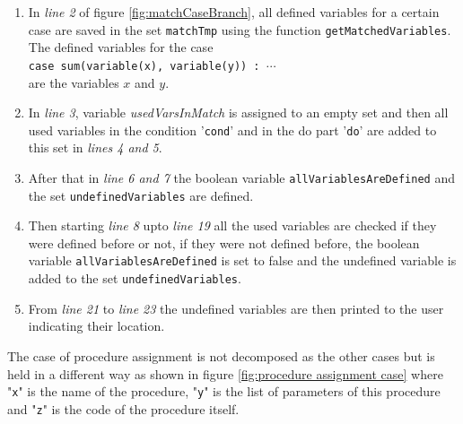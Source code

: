 \documentclass[11pt]{report}
\begin{document}
\begin{enumerate}
\item In \textsl{line 2} of figure \ref{fig:matchCaseBranch}, all defined variables for a certain case are saved in the set \texttt{matchTmp} using the function \texttt{getMatchedVariables}. The defined variables for the case
\\[0.2cm]
\hspace*{0.6cm} 
\texttt{case sum(variable(x), variable(y)) : $\cdots$}
\\[0.2cm]
are the variables $x$ and $y$.

\item In \textsl{line 3}, variable \textsl{usedVarsInMatch} is assigned to an empty set and then all used variables in the condition '\texttt{cond}' and in the do part '\texttt{do}' are added to this set in \textsl{lines 4 and 5}.

\item After that in \textsl{line 6 and 7} the boolean variable \texttt{allVariablesAreDefined} and the set \texttt{undefinedVariables} are defined.

\item Then starting \textsl{line 8} upto \textsl{line 19} all the used variables are checked if they were defined before or not, if they were not defined before, the boolean variable \texttt{allVariablesAreDefined} is set to false and the undefined variable is added to the set \texttt{undefinedVariables}.

\item From \textsl{line 21} to \textsl{line 23} the undefined variables are then printed to the user indicating their location.

\end{enumerate}

The case of procedure assignment is not decomposed as the other cases but is held in a different way as shown in figure \ref{fig:procedure assignment case} where "\texttt{x}" is the name of the procedure, "\texttt{y}" is the list of parameters of this procedure and "\texttt{z}" is the code of the procedure itself.
\end{document}
